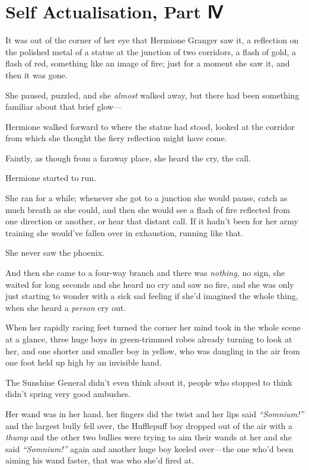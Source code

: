 \chapter{Self Actualisation, Part Ⅳ}\label{self-actualisation-part}

It was out of the corner of her eye that Hermione Granger saw it, a
reflection on the polished metal of a statue at the junction of two
corridors, a flash of gold, a flash of red, something like an image of
fire; just for a moment she saw it, and then it was gone.

She paused, puzzled, and she \emph{almost} walked away, but there had
been something familiar about that brief glow---

Hermione walked forward to where the statue had stood, looked at the
corridor from which she thought the fiery reflection might have come.

Faintly, as though from a faraway place, she heard the cry, the call.

Hermione started to run.

She ran for a while; whenever she got to a junction she would pause,
catch as much breath as she could, and then she would see a flash of
fire reflected from one direction or another, or hear that distant call.
If it hadn't been for her army training she would've fallen over in
exhaustion, running like that.

She never saw the phoenix.

And then she came to a four-way branch and there was \emph{nothing,} no
sign, she waited for long seconds and she heard no cry and saw no fire,
and she was only just starting to wonder with a sick sad feeling if
she'd imagined the whole thing, when she heard a \emph{person} cry out.

When her rapidly racing feet turned the corner her mind took in the
whole scene at a glance, three huge boys in green-trimmed robes already
turning to look at her, and one shorter and smaller boy in yellow, who
was dangling in the air from one foot held up high by an invisible hand.

The Sunshine General didn't even think about it, people who stopped to
think didn't spring very good ambushes.

Her wand was in her hand, her fingers did the twist and her lips said
\emph{``Somnium!''} and the largest bully fell over, the Hufflepuff boy
dropped out of the air with a \emph{thump} and the other two bullies
were trying to aim their wands at her and she said \emph{``Somnium!''}
again and another huge boy keeled over---the one who'd been aiming his
wand faster, that was who she'd fired at.

